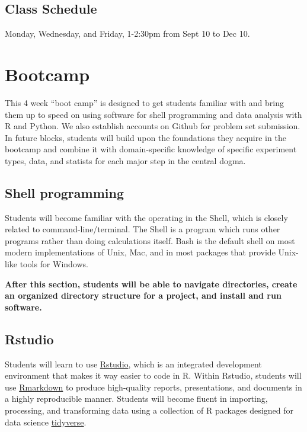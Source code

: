 \documentclass[]{book}
\begin{document}
\hypertarget{class-schedule}{%
\section{Class Schedule}\label{class-schedule}}

Monday, Wednesday, and Friday, 1-2:30pm from Sept 10 to Dec 10.

\hypertarget{bootcamp}{%
\chapter{Bootcamp}\label{bootcamp}}

This 4 week ``boot camp'' is designed to get students familiar with and bring them up to speed on using software for shell programming and data analysis with R and Python. We also establish accounts on Github for problem set submission. In future blocks, students will build upon the foundations they acquire in the bootcamp and combine it with domain-specific knowledge of specific experiment types, data, and statists for each major step in the central dogma.

\hypertarget{shell-programming}{%
\section{Shell programming}\label{shell-programming}}

Students will become familiar with the operating in the Shell, which is closely related to command-line/terminal. The Shell is a program which runs other programs rather than doing calculations itself. Bash is the default shell on most modern implementations of Unix, Mac, and in most packages that provide Unix-like tools for Windows.

\textbf{After this section, students will be able to navigate directories, create an organized directory structure for a project, and install and run software.}

\hypertarget{rstudio}{%
\section{Rstudio}\label{rstudio}}

Students will learn to use \href{https://www.rstudio.com/}{Rstudio}, which is an integrated development environment that makes it way easier to code in R. Within Rstudio, students will use \href{https://rmarkdown.rstudio.com/}{Rmarkdown} to produce high-quality reports, presentations, and documents in a highly reproducible manner. Students will become fluent in importing, processing, and transforming data using a collection of R packages designed for data science \href{https://www.tidyverse.org/}{tidyverse}.
\end{document}
